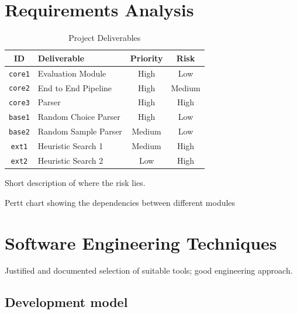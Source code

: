 \documentclass[12pt,a4paper,twoside,openright]{report}
\theoremstyle{definition}
\begin{document}
%
\section{Requirements Analysis}




\begin{table}[ht]
  \caption{Project Deliverables}
  \vspace{\baselineskip}
  \label{requirements}
  \centering
  \begin{tabularx}{0.9\textwidth}{cXcc}
    {\large \textbf{ID}} & \large \textbf{Deliverable} & \large \textbf{Priority} & \large \textbf{Risk} \\
    \toprule
    \texttt{core1} & Evaluation Module & High & Low \\
  \texttt{core2} & End to End Pipeline  & High & Medium \\
    \texttt{core3} & Parser & High & High \\
    \texttt{base1} & Random Choice Parser & High & Low \\
    \texttt{base2} & Random Sample Parser & Medium & Low \\
    \texttt{ext1} & Heuristic Search 1 & Medium & High \\
    \texttt{ext2} & Heuristic Search 2 & Low & High \\
  \end{tabularx}
\end{table}

\par
Short description of where the risk lies. 
\par
Pertt chart showing the dependencies between different modules


\section{Software Engineering Techniques}
Justified and documented selection of suitable tools; good engineering approach.


\subsection{Development model}
\end{document}
